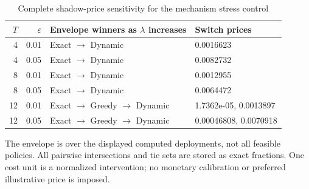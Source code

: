 \begin{table}[htbp]
\centering\footnotesize
\caption{Complete shadow-price sensitivity for the mechanism stress control}\label{tab:frontier}
\begin{tabular}{rrll}\toprule
$T$ & $\varepsilon$ & Envelope winners as $\lambda$ increases & Switch prices \\\midrule
4 & 0.01 & Exact $\to$ Dynamic & 0.0016623 \\
4 & 0.05 & Exact $\to$ Dynamic & 0.0082732 \\
8 & 0.01 & Exact $\to$ Dynamic & 0.0012955 \\
8 & 0.05 & Exact $\to$ Dynamic & 0.0064472 \\
12 & 0.01 & Exact $\to$ Greedy $\to$ Dynamic & 1.7362e-05, 0.0013897 \\
12 & 0.05 & Exact $\to$ Greedy $\to$ Dynamic & 0.00046808, 0.0070918 \\
\bottomrule\end{tabular}
\par\smallskip\begin{minipage}{.98\textwidth}\footnotesize The envelope is over the displayed computed deployments, not all feasible policies. All pairwise intersections and tie sets are stored as exact fractions. One cost unit is a normalized intervention; no monetary calibration or preferred illustrative price is imposed.\end{minipage}
\end{table}
